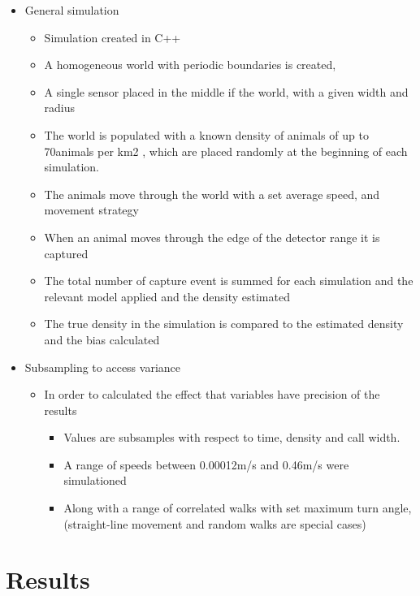 \documentclass[a4paper,10pt,reqno,oneside]{amsart}
\begin{document}
\begin{itemize}
\item General simulation
	\begin{itemize}
	\item Simulation created in C++
	\item A homogeneous world with periodic boundaries is created, 
	\item A single sensor placed in the middle if the world, with a given width and radius
	\item The world is populated with a known density of animals of up to 70animals per km2 \citep{damuth1981population}, which are placed randomly at the beginning of each simulation.
	\item The animals move through the world with a set average speed, and movement strategy
	\item When an animal moves through the edge of the detector range it is captured
	\item The total number of capture event is summed for each simulation and the relevant model applied and the density estimated
	\item The true density in the simulation is compared to the estimated density and the bias calculated
	\end{itemize}

\item Subsampling to access variance
	\begin{itemize}
	\item In order to calculated the effect that variables have precision of the results
		\begin{itemize}
		\item Values are subsamples with respect to time, density and call width.
		\item A range of speeds between 0.00012m/s and 0.46m/s \citep{carbone2005far} were simulationed
		\item Along with a range of correlated walks with set maximum turn angle, (straight-line movement and random walks are special cases)
		\end{itemize}
	\end{itemize}
 
\end{itemize}






\section{Results}
\end{document}
